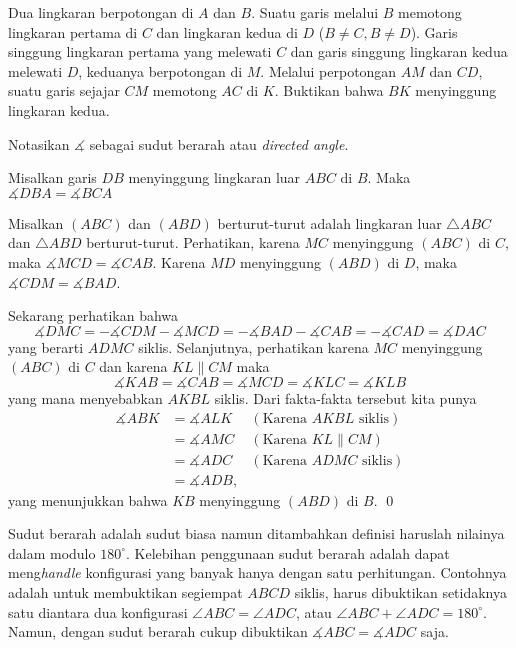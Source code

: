\documentclass[11pt]{scrartcl}
\begin{document}
	\begin{soaljawab} Dua lingkaran berpotongan di $A$ dan $B$. Suatu garis melalui $B$ memotong lingkaran pertama di $C$ dan lingkaran kedua di $D$ ($B \neq C, B \neq D$).  Garis singgung lingkaran pertama yang melewati $C$ dan garis singgung lingkaran kedua melewati $D$, keduanya berpotongan di $M$. Melalui perpotongan $AM$ dan $CD$, suatu garis sejajar $CM$ memotong $AC$ di $K$. Buktikan bahwa $BK$ menyinggung lingkaran kedua.\\
	
	\begin{solusi}
		Notasikan $\measuredangle$ sebagai sudut berarah atau \textit{directed angle}.
		
		\begin{lemmarev}
		Misalkan garis $DB$ menyinggung lingkaran luar $ABC$ di $B$. Maka $\measuredangle DBA = \measuredangle BCA$
		\end{lemmarev}
		Misalkan $(ABC)$ dan $(ABD)$ berturut-turut adalah lingkaran luar $\triangle ABC$ dan $\triangle ABD$ berturut-turut. Perhatikan, karena $MC$ menyinggung $(ABC)$ di $C$, maka $\measuredangle MCD = \measuredangle CAB$. Karena $MD$ menyinggung $(ABD)$ di $D$, maka $\measuredangle CDM = \measuredangle BAD$.
		
		Sekarang perhatikan bahwa $$\measuredangle DMC = -\measuredangle CDM -\measuredangle MCD = -\measuredangle BAD -\measuredangle CAB = -\measuredangle CAD = \measuredangle DAC$$ yang berarti $ADMC$ siklis. Selanjutnya, perhatikan karena $MC$ menyinggung $(ABC)$ di $C$ dan karena $KL \parallel CM$ maka $$\measuredangle KAB = \measuredangle CAB = \measuredangle MCD = \measuredangle KLC = \measuredangle KLB$$ yang mana menyebabkan $AKBL$ siklis.
		Dari fakta-fakta tersebut kita punya 
		\begin{align*}
		\measuredangle ABK &= \measuredangle ALK & (\text{Karena }AKBL \text{ siklis})\\
		&= \measuredangle AMC & (\text{Karena }KL \parallel CM)\\
		&= \measuredangle ADC & (\text{Karena }ADMC \text{ siklis})\\
		&= \measuredangle ADB,
		\end{align*}yang menunjukkan bahwa $KB$ menyinggung $(ABD)$ di $B$. \qed
	\end{solusi}
	\begin{remark*}
				Sudut berarah adalah sudut biasa namun ditambahkan definisi haruslah nilainya dalam modulo $180^\circ$. Kelebihan penggunaan sudut berarah adalah dapat meng\textit{handle} konfigurasi yang banyak hanya dengan satu perhitungan. Contohnya adalah untuk membuktikan segiempat $ABCD$ siklis, harus dibuktikan setidaknya satu diantara dua konfigurasi $\angle ABC = \angle ADC$, atau $\angle ABC + \angle ADC = 180^\circ$. Namun, dengan sudut berarah cukup dibuktikan $\measuredangle ABC = \measuredangle ADC$ saja.
			\end{remark*}
	\end{soaljawab}
	
\end{document}

